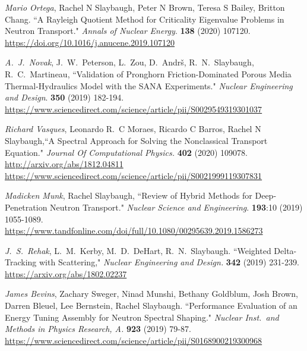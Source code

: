 \begin{bibsection}
\item \textit{Mario Ortega}, Rachel N Slaybaugh, Peter N Brown, Teresa S Bailey,
Britton Chang. ``A Rayleigh Quotient Method for Criticality Eigenvalue Problems
in Neutron Transport." \textit{Annals of Nuclear Energy}. \textbf{138} (2020)
107120.\\
\url{https://doi.org/10.1016/j.anucene.2019.107120}

\item \textit{A.\ J.\ Novak}, J.\ W.\ Peterson, L.\ Zou, D.\ Andr\v{s}, R.\ N.\ Slaybaugh, R.\ C.\ Martineau, ``Validation of Pronghorn Friction-Dominated Porous Media Thermal-Hydraulics Model with the SANA Experiments." \textit{Nuclear Engineering and Design}. \textbf{350} (2019) 182-194.\\
\url{https://www.sciencedirect.com/science/article/pii/S0029549319301037}

\item \textit{Richard Vasques},  Leonardo R.\ C Moraes, Ricardo C Barros, Rachel
N Slaybaugh,``A Spectral Approach for Solving the Nonclassical Transport
Equation." \textit{Journal Of Computational Physics.} \textbf{402} (2020)
109078.\\
\url{http://arxiv.org/abs/1812.04811}\\
\url{https://www.sciencedirect.com/science/article/pii/S0021999119307831}

\item \textit{Madicken Munk}, Rachel Slaybaugh, ``Review of Hybrid Methods for Deep-Penetration Neutron Transport."  \textit{Nuclear Science and Engineering}. \textbf{193}:10 (2019) 1055-1089.\\
\url{https://www.tandfonline.com/doi/full/10.1080/00295639.2019.1586273}

\item \textit{J.\ S.\ Rehak}, L.\ M.\ Kerby, M.\ D.\ DeHart, R.\ N.\ Slaybaugh. ``Weighted Delta-Tracking with Scattering," \textit{Nuclear Engineering and Design.} \textbf{342} (2019) 231-239. \\
\url{https://arxiv.org/abs/1802.02237}

\item \textit{James Bevins}, Zachary Sweger, Ninad Munshi, Bethany Goldblum, Josh Brown, Darren Bleuel, Lee Bernstein, Rachel Slaybaugh. ``Performance Evaluation of an Energy Tuning Assembly for Neutron Spectral Shaping." \textit{Nuclear Inst.\ and Methods in Physics Research, A.} \textbf{923} (2019) 79-87.\\
\url{https://www.sciencedirect.com/science/article/pii/S0168900219300968}


\end{bibsection}
